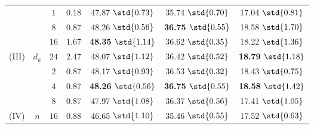 \begin{table}[!t]
{\begin{tabularx}{\linewidth}{lcccccc}
\midrule

&
&$1$
&0.18
&47.87$~\std{0.73}$ 
&35.74$~\std{0.70}$ 
&17.04$~\std{0.81}$
\\


&
&$8$
&0.87
&{48.26$~\std{0.56}$}
&\textbf{36.75$~\std{0.55}$}
&{18.58$~\std{1.70}$}
\\

&
&$16$
&1.67
&\textbf{48.35}$~\std{1.14}$ 
&36.62$~\std{0.35}$ 
&18.22$~\std{1.36}$
\\

\multirow{-4}{*}{(III)} 
&\multirow{-4}{*}{{$d_k$}} 
&$24$
&2.47
&48.07$~\std{1.12}$ 
&36.42$~\std{0.52}$
&\textbf{18.79}$~\std{1.18}$
\\

\midrule

&
&$2$
&0.87
&48.17$~\std{0.93}$ 
&36.53$~\std{0.32}$ 
&18.43$~\std{0.75}$
\\ 

&
&$4$
&0.87
&\textbf{48.26$~\std{0.56}$}
&\textbf{36.75$~\std{0.55}$}
&\textbf{18.58$~\std{1.42}$}
\\

&
&$8$
&0.87
&47.97$~\std{1.08}$ 
&36.37$~\std{0.56}$ 
&17.41$~\std{1.05}$
\\ 

\multirow{-4}{*}{(IV)} 
&\multirow{-4}{*}{{$n$}} 
&$16$
&0.88
&46.65$~\std{1.10}$ 
&35.46$~\std{0.55}$
&17.52$~\std{0.63}$
\\

\bottomrule
\end{tabularx}
}
\end{table}
